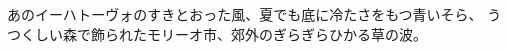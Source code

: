 \documentclass[uplatex,dvipdfmx,11pt]{jsarticle}
\begin{document}
    あのイーハトーヴォのすきとおった風、夏でも底に冷たさをもつ青いそら、
    うつくしい森で飾られたモリーオ市、郊外のぎらぎらひかる草の波。

\end{document}
